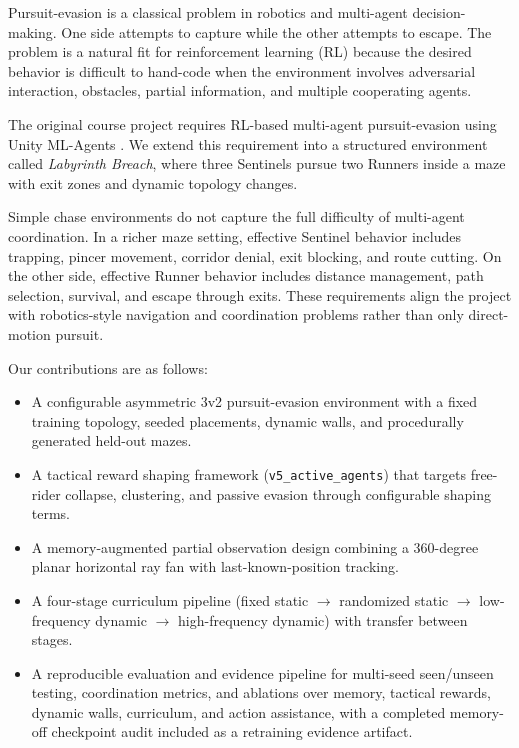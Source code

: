 \documentclass[journal]{IEEEtran}
\begin{document}
Pursuit-evasion is a classical problem in robotics and multi-agent decision-making. One side attempts to capture while the other attempts to escape. The problem is a natural fit for reinforcement learning (RL) because the desired behavior is difficult to hand-code when the environment involves adversarial interaction, obstacles, partial information, and multiple cooperating agents.

The original course project requires RL-based multi-agent pursuit-evasion using Unity ML-Agents \cite{ai641projectdoc}. We extend this requirement into a structured environment called \textit{Labyrinth Breach}, where three Sentinels pursue two Runners inside a maze with exit zones and dynamic topology changes.

Simple chase environments do not capture the full difficulty of multi-agent coordination. In a richer maze setting, effective Sentinel behavior includes trapping, pincer movement, corridor denial, exit blocking, and route cutting. On the other side, effective Runner behavior includes distance management, path selection, survival, and escape through exits. These requirements align the project with robotics-style navigation and coordination problems rather than only direct-motion pursuit.

Our contributions are as follows:
\begin{itemize}
    \item A configurable asymmetric 3v2 pursuit-evasion environment with a fixed training topology, seeded placements, dynamic walls, and procedurally generated held-out mazes.
    \item A tactical reward shaping framework (\texttt{v5\_active\_agents}) that targets free-rider collapse, clustering, and passive evasion through configurable shaping terms.
    \item A memory-augmented partial observation design combining a 360-degree planar horizontal ray fan with last-known-position tracking.
    \item A four-stage curriculum pipeline (fixed static $\to$ randomized static $\to$ low-frequency dynamic $\to$ high-frequency dynamic) with transfer between stages.
    \item A reproducible evaluation and evidence pipeline for multi-seed seen/unseen testing, coordination metrics, and ablations over memory, tactical rewards, dynamic walls, curriculum, and action assistance, with a completed memory-off checkpoint audit included as a retraining evidence artifact.
\end{itemize}
\end{document}
